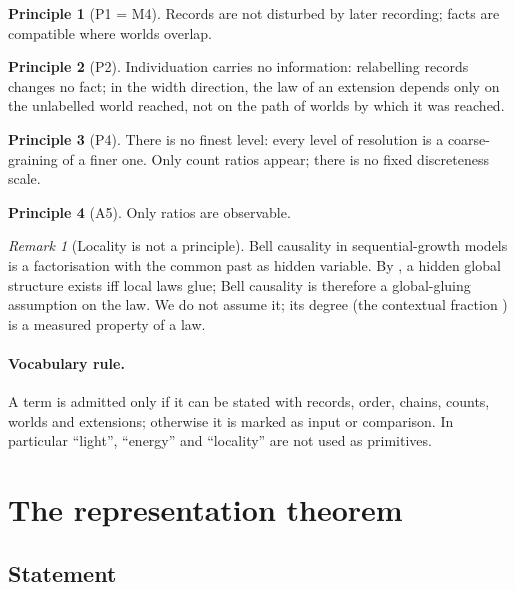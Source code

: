 \documentclass[11pt]{article}
\theoremstyle{definition}
\newtheorem{principle}{Principle}
\theoremstyle{remark}
\newtheorem{remark}[theorem]{Remark}
\begin{document}
\begin{principle}[P1 = M4]\label{p1} Records are not disturbed by later recording; facts are compatible where worlds overlap.\end{principle}
\begin{principle}[P2]\label{p2} Individuation carries no information: relabelling records changes no fact; in the width direction, the law of an extension depends only on the unlabelled world reached, not on the path of worlds by which it was reached.\end{principle}
\begin{principle}[P4]\label{p4} There is no finest level: every level of resolution is a coarse-graining of a finer one. Only count ratios appear; there is no fixed discreteness scale.\end{principle}
\begin{principle}[A5]\label{a5} Only ratios are observable.\end{principle}

\begin{remark}[Locality is not a principle]
Bell causality in sequential-growth models \cite{rideoutsorkin} is a factorisation with the common past as hidden variable. By \cite{pzfc}, a hidden global structure exists iff local laws glue; Bell causality is therefore a global-gluing assumption on the law. We do not assume it; its degree (the contextual fraction \cite{abramsky}) is a measured property of a law.
\end{remark}

\paragraph{Vocabulary rule.} A term is admitted only if it can be stated with records, order, chains, counts, worlds and extensions; otherwise it is marked as input or comparison. In particular ``light'', ``energy'' and ``locality'' are not used as primitives.

\section{The representation theorem}\label{sec:rep}

\subsection{Statement}
\end{document}
